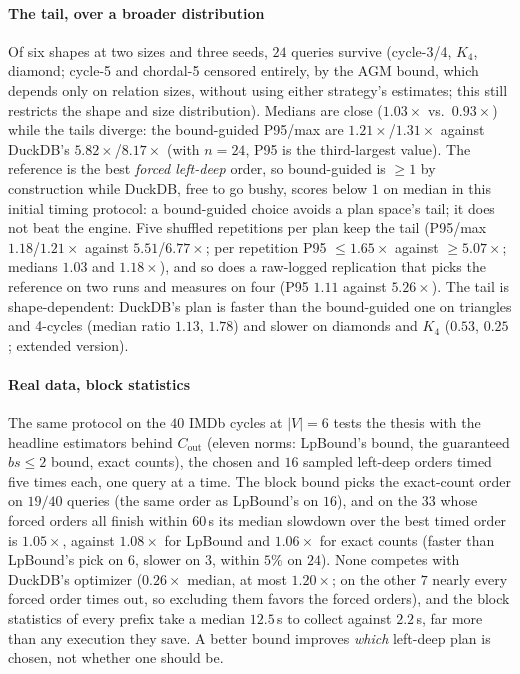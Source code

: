 \documentclass[sigconf, nonacm, acmthm=false]{acmart}
\begin{document}
\paragraph{The tail, over a broader distribution}
Of six shapes at two sizes and three seeds, $24$ queries survive
(cycle-3/4, $K_4$, diamond; cycle-5 and chordal-5 censored entirely, by
the AGM bound, which depends only on relation sizes, without using either strategy's estimates; this still restricts the shape and size distribution). Medians are close
($1.03\times$ vs.\ $0.93\times$) while the tails diverge: the
bound-guided P95/max are $1.21\times$/$1.31\times$ against DuckDB's
$5.82\times$/$8.17\times$ (with $n{=}24$, P95 is the third-largest
value). The reference is the best \emph{forced left-deep} order, so
bound-guided is ${\ge}1$ by construction while DuckDB, free to go bushy, scores below $1$ on median in this initial timing protocol: a bound-guided choice avoids a plan space's tail; it does not beat the engine. Five shuffled repetitions per plan keep the tail (P95/max $1.18$/$1.21\times$ against $5.51$/$6.77\times$; per repetition P95 ${\le}1.65\times$ against ${\ge}5.07\times$; medians $1.03$ and $1.18\times$), and so does a raw-logged replication that picks the reference on two runs and measures on four (P95 $1.11$ against $5.26\times$). The tail is shape-dependent: DuckDB's plan is faster than the bound-guided one on triangles and 4-cycles (median ratio $1.13$, $1.78$) and slower on diamonds and $K_4$ ($0.53$, $0.25$; extended version).

\paragraph{Real data, block statistics} The same protocol on the $40$
IMDb cycles at $|V|{=}6$ tests the thesis with the headline estimators
behind $C_{\mathrm{out}}$ (eleven norms: LpBound's bound, the guaranteed
$bs{\le}2$ bound, exact counts), the chosen and $16$ sampled left-deep orders
timed five times each, one query at a time. The block bound picks the
exact-count order on $19/40$ queries (the same order as LpBound's on $16$), and on the
$33$ whose forced orders all finish within $60$\,s its median slowdown over
the best timed order is $1.05\times$, against $1.08\times$ for LpBound and
$1.06\times$ for exact counts (faster than LpBound's pick on $6$, slower on
$3$, within $5\%$ on $24$). None competes with DuckDB's optimizer
($0.26\times$ median, at most $1.20\times$; on the other $7$ nearly every forced order times out, so excluding them favors the forced orders), and the block statistics of every
prefix take a median $12.5$\,s to collect against $2.2$\,s, far more than any
execution they save. A better bound improves \emph{which} left-deep plan is
chosen, not whether one should be.
\end{document}
